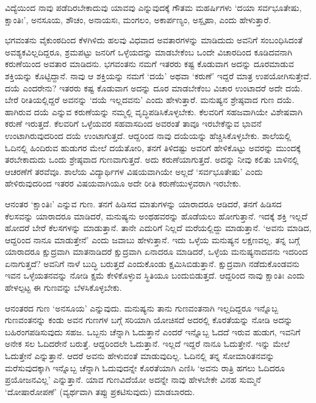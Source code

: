 ವಿದ್ಯೆಯಿಂದ ನಾವು 
ಪಡೆದಿರಬೇಕಾದುವು ಯಾವವು 
ಎನ್ನುವುದಕ್ಕೆ ಗೌತಮ 
ಮಹರ್ಷಿಗಳು `ದಯಾ ಸರ್ವಭೂತೇಷು, 
ಕ್ಷಾಂತಿಃ', ಅನಸೂಯ, ಶೌಚಂ, 
ಅನಾಯಸಃ, ಮಂಗಲಂ, ಅಕಾರ್ಪಣ್ಯಂ, ಅಸ್ಪೃಹಾ, ಎಂದು ಹೇಳುತ್ತಾರೆ.

ಭಗವಂತನು ವೈಕುಂಠದಿಂದ 
ಕೆಳಗಿಳಿದು ಹಲವು ವಿಧವಾದ 
ಅವತಾರಗಳನ್ನು ಮಾಡಿದುದು 
ಅವನಿಗೆ ಸಂಬಂಧಿಸಿದಂತೆ 
ಅವಶ್ಯಕವಿಲ್ಲದಿದ್ದರೂ, 
ಶ್ರಮಪಟ್ಟು ಜನರಿಗೆ 
ಒಳ್ಳೆಯದನ್ನು ಮಾಡಬೇಕೆಂಬ 
ಒಂದೇ ವಿಚಾರದಿಂದ ಕೂಡಿದವನಾಗಿ 
ಕರುಣೆಯಿಂದ ಅವತಾರ ಮಾಡಿದನು. 
ಭಗವಂತನು ನಮಗೆ ಇತರರು ಕಷ್ಟ 
ಕೊಡುವಾಗ ಅದನ್ನು ದೂರಮಾಡುವ 
ಶಕ್ತಿಯನ್ನು ಕೊಟ್ಟಿದ್ದಾನೆ. 
ನಾವು ಆ ಶಕ್ತಿಯನ್ನು ನಮಗೆ 
`ದಯೆ' ಅಥವಾ `ಕರುಣೆ' ಇದ್ದರೆ 
ಮಾತ್ರ ಉಪಯೋಗಿಸುತ್ತೇವೆ. ದಯೆ 
ಎಂದರೇನು? ಇತರರು ಕಷ್ಟ 
ಕೊಡುವಾಗ ಅದನ್ನು ದೂರ 
ಮಾಡಬೇಕೆಂಬ ವಿಚಾರ ಉಂಟಾದರೆ 
ಅದೇ ದಯೆ. ಬೇರೆ 
ರೀತಿಯಲ್ಲಿದ್ದರೆ ಅವನನ್ನು 
`ದಯೆ ಇಲ್ಲದವನು' ಎಂದು 
ಹೇಳುತ್ತಾರೆ. ಮನುಷ್ಯನ 
ಶ್ರೇಷ್ಠವಾದ ಗುಣ ದಯೆ. 
ಹಾಗಿರುವ ದಯೆ ಎನ್ನುವ 
ಕರುಣೆಯನ್ನು ನಮ್ಮಲ್ಲಿ 
ವೃದ್ಧಿಪಡಿಸಿಕೊಳ್ಳಬೇಕು. 
ಕೆಲವರಿಗೆ ಸಹಜವಾಗಿಯೇ 
ವಿಶೇಷವಾಗಿ ಕರುಣೆ ಇರುತ್ತದೆ. 
ಕೆಲವರಿಗೆ ಒಳ್ಳೆಯವರ 
ಸಹವಾಸದಿಂದ ಅವರಂತೆ ತಾವೂ 
ಇರಬೇಕೆನ್ನುವ ಭಾವನೆ 
ಉಂಟಾಗಿರುವುದರಿಂದ ದಯೆ 
ಉಂಟಾಗುತ್ತದೆ. ಆದ್ದರಿಂದ 
ನಾವು ದಯೆಯನ್ನು 
ಹೆಚ್ಚಿಸಿಕೊಳ್ಳಬೇಕು. 
ಶಾಲೆಯಲ್ಲಿ ಓದಿನಲ್ಲಿ 
ಹಿಂದಿರುವ ಹುಡುಗರ ಮೇಲೆ 
ದಯೆತೋರಿ, ತನಗೆ ತಿಳಿದಷ್ಟು 
ಅವರಿಗೆ ಹೇಳಿಕೊಟ್ಟು ಅವರನ್ನು 
ಮುಂದಕ್ಕೆ ತರಬೇಕಾದುದು ಒಂದು 
ಶ್ರೇಷ್ಠವಾದ ಗುಣವಾಗುತ್ತದೆ. 
ಅದು ಕರುಣೆಯಾಗುತ್ತದೆ. 
ಅದನ್ನು ನೀವು ಕಲಿತು ಬಾಳಿನಲ್ಲಿ 
ಆಚರಣೆಗೆ ತರವೆವೂ. ಶಾಲೆಯ 
ವಿದ್ಯಾರ್ಥಿಗಳ ವಿಷಯವಾಗಿಯೇ 
ಅಲ್ಲದೆ `ಸರ್ವಭೂತೇಷು' ಎಂದು 
ಹೇಳಿರುವುದರಿಂದ ಇತರರ ವಿಷಯವಾಗಿಯೂ ಅದೇ ರೀತಿ ಕರುಣೆಯುಳ್ಳವರಾಗಿ ಇರಬೇಕು. 

ಆನಂತರ `ಕ್ಷಾಂತಿಃ' ಎನ್ನುವ 
ಗುಣ. ತನಗೆ ಹಿಡಿಸದ 
ಮಾತುಗಳನ್ನು ಯಾರಾದರೂ 
ಆಡಿದರೆ, ತನಗೆ ಹಿಡಿಸದ 
ಕೆಲಸವನ್ನು ಯಾರಾದರೂ 
ಮಾಡಿದರೆ, ಮನುಷ್ಯನು 
ಅಂಥಹವರನ್ನು ಹೊಡೆಯಲು 
ಹೋಗುತ್ತಾನೆ. ಇದಕ್ಕೆ ಶಕ್ತಿ 
ಇಲ್ಲದೆ ಹೋದರೆ ಬೇರೆ 
ಕೆಲಸಗಳನ್ನು ಮಾಡುತ್ತಾನೆ. 
ತಾನೇ ಎದುರಿಗೆ ನಿಲ್ಲದೆ 
ಮರೆಯಲ್ಲಿದ್ದು ಮಾಡುತ್ತಾನೆ. 
`ಅವನು ಮಾಡಿದ, ಆದ್ದರಿಂದ ನಾನೂ 
ಮಾಡುತ್ತೇನೆ' ಎಂದು ಜವಾಬು 
ಹೇಳುತ್ತಾನೆ. ಇದು ಒಳ್ಳೆಯ 
ಮನುಷ್ಯನ ಲಕ್ಷಣವಲ್ಲ. ತನ್ನ 
ಬಗ್ಗೆ ಯಾರಾದರೂ ಕ್ಷುದ್ರವಾಗಿ 
ಮಾತನಾಡಿದರೆ ಕ್ಷುದ್ರವಾಗಿ 
ಏನಾದರೂ ಮಾಡಿದರೆ, ಒಳ್ಳೆಯ 
ಮನುಷ್ಯನಾದವನು ಇದರಿಂದ 
ಏನಾಗುತ್ತದೆ? ಅವನಿಗೆ ನಾಳೆ 
ಬುದ್ಧಿ ಬರುತ್ತದೆ ಎಂದುಕೊಂಡು 
ಕ್ಷಮಿಸಿಬಿಡುತ್ತಾನೆ. 
ಕ್ಷುದ್ರವಾಗಿ ನಡೆದುಕೊಂಡವನು 
ಇವನ ಒಳ್ಳೆಯತನವನ್ನು ನೋಡಿ 
ಕ್ಷಮೆ ಕೇಳಿಕೊಳ್ಳುವ 
ಸ್ಥಿತಿಯೂ ಬಂದುಬಿಡುತ್ತದೆ. 
ಆದ್ದರಿಂದ ನಾವು ಕ್ಷಾಂತಿಃ ಎಂದು ಹೇಳಲ್ಪಟ್ಟ ಈ ಗುಣವನ್ನು ಬೆಳಸಿಕೊಳ್ಳಬೇಕು.

ಆನಂತರದ ಗುಣ `ಅನಸೂಯ' 
ಎನ್ನುವುದು. ಮನುಷ್ಯನು ತಾನು 
ಗುಣವಂತನಾಗಿ ಇಲ್ಲದಿದ್ದರೂ 
ಇನ್ನೊಬ್ಬ ಗುಣವಂತನನ್ನು ಕಂಡು 
ಅವನ ಗುಣಗಳ ಬಗ್ಗೆ ಸರಿಯಾಗಿ 
ಯೋಚಿಸದೆ ಅದರಲ್ಲಿ 
ಕೊರತೆಯನ್ನು ನೋಡಿ ಅದನ್ನು 
ಬಹಿರಂಗಪಡಿಸುವುದು ಸಹಜ. 
ಒಬ್ಬನು ಚೆನ್ನಾಗಿ ಓದುತ್ತಾನೆ 
ಎಂದರೆ ಇನ್ನೊಬ್ಬ ಓದದೆ ಇರುವ 
ಹುಡುಗ, ಇವನಿಗೆ ಅನೇಕ ಸಲ 
ಓದಿದರೇನೆ ಬರುತ್ತೆ. 
ಆದ್ದರಿಂದಲೇ ಓದುತ್ತಾನೆ. 
ಇಲ್ಲದೆ ಇದ್ದರೆ ನಾನೂ 
ಓದುತ್ತೇನೆ. ಇನ್ನು ಮೇಲೆ 
ಓದುತ್ತೇನೆ ಎನ್ನುತ್ತಾನೆ. 
ಆದರೆ ಅವನು ಹೇಳುವಂತೆ 
ಮಾಡುವುದಿಲ್ಲ. ಓದಿನಲ್ಲಿ 
ತನ್ನ ಸೋಮಾರಿತನವನ್ನು 
ಮರೆಸುವುದಕ್ಕಾಗಿ ಇನ್ನೊಬ್ಬ 
ಚೆನ್ನಾಗಿ ಓದುವುದನ್ನೇ 
ಕೊರತೆಯಾಗಿ ಎಣಿಸಿ `ಅವನು 
ರಾತ್ರಿ ಹಗಲು ಓದಿದರೂ 
ಪ್ರಯೋಜನವಿಲ್ಲ' 
ಎನ್ನುತ್ತಾನೆ. ಯಾವ 
ಗುಣವಿದೆಯೋ ಅದನ್ನೇ ನಾವು 
ಹೇಳಬೇಕೇ ವಿನಹ ಸುಮ್ಮನೆ 
`ದೋಷಾರೋಪಣೆ' (ವ್ಯರ್ಥವಾಗಿ ತಪ್ಪು ಪ್ರಕಟಿಸುವುದು) ಮಾಡಬಾರದು.

